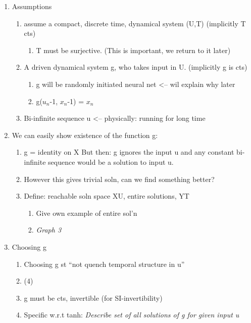 \documentclass[12pt, oneside]{article}
\theoremstyle{definition}
\begin{document}
\begin{enumerate}
  \item Assumptions
  \begin{enumerate}
      \item assume a compact, discrete time, dynamical system (U,T) (implicitly T cts)
      \begin{enumerate}
          \item T must be surjective. (This is important, we return to it later)  
      \end{enumerate}
      \item  A driven dynamical system g, who takes input in U. (implicitly g is cts)
      \begin{enumerate}
         \item g will be randomly initiated neural net <--  wil explain why later
        \item  g($u_{n}$-1, $x_{n}$-1) = $x_{n}$
      \end{enumerate}
      \item Bi-infinite sequence u <-- physically: running for long time
  \end{enumerate}

  \item We can easily show existence of the function g:
  \begin{enumerate}
    \item   g = identity on X 
    \newline But then: g ignores the input u and any constant bi-infinite sequence would be a solution to input u.
    \item  However this gives trivial soln, can we find something better?
    \item  Define: reachable soln space XU, entire solutions, YT
    \begin{enumerate}
      \item Give own example of entire sol'n
      \item \emph{Graph 3}
    \end{enumerate}
  \end{enumerate}
  \item Choosing g
  \begin{enumerate}
      \item Choosing g st “not quench temporal structure in u”
      \item(4)
      \item  g must be cts, invertible (for SI-invertibility)
      \item Specific w.r.t tanh:
       \newline \emph{Describe set of all solutions of g for given input u}
  \end{enumerate}
\end{enumerate}
\end{document}
